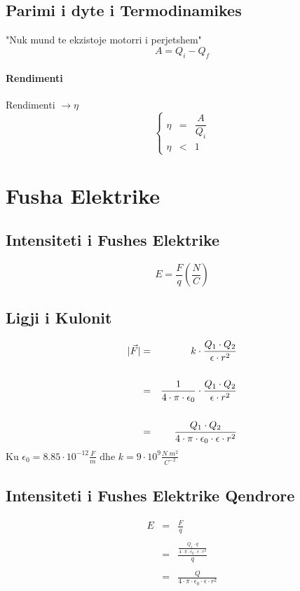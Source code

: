 \documentclass[a4paper, twocolumn]{article}
\DeclarePairedDelimiter\abs{\lvert}{\rvert}
\begin{document}
\subsection{Parimi i dyte i Termodinamikes}
"Nuk mund te ekzistoje motorri i perjetshem"
\[
A=Q_{i}-Q_{f}
\]
\paragraph{Rendimenti}
Rendimenti $\to \eta $
\[
\left\{
	\begin{array}{rcl}
		\eta &=& \dfrac{A}{Q_{i}}\\
		\eta &<& 1
	\end{array}
\right.
\]
\section{Fusha Elektrike}
\subsection{Intensiteti i Fushes Elektrike}
\[
	E=\frac{F}{q} \left( \frac{N}{C} \right)
\]
\subsection{Ligji i Kulonit}
\begin{eqnarray*}
\abs{\vec{F}}&=&k\cdot \frac{Q_{1}\cdot Q_{2}}{\epsilon \cdot r^2}\\
\\
&=&\frac{1}{4\cdot \pi \cdot \epsilon _{0}} \cdot \frac{Q_{1}\cdot Q_{2}}{\epsilon \cdot r^2}\\
\\
&=&\frac{Q_{1}\cdot Q_{2}}{4\cdot \pi \cdot \epsilon _{0}\cdot \epsilon \cdot r^2}\\
\end{eqnarray*}
Ku $\epsilon _{0} = 8.85\cdot 10^{-12} \frac{F}{m}$ dhe $k=9\cdot 10^9 \frac{N \; m^2}{C^{-2}}$
\subsection{Intensiteti i Fushes Elektrike Qendrore}
\begin{eqnarray*}
	E&=& \frac{F}{q} \\
	\\
	 &= & \frac{\frac{Q_{1}\cdot q}{4\cdot \pi \cdot \epsilon _{0}\cdot \epsilon \cdot r^2} }{q} \\
	 \\
	 &= & \frac{Q}{4\cdot \pi \cdot \epsilon _{0}\cdot \epsilon \cdot r^2} \\
\end{eqnarray*}
\end{document}
